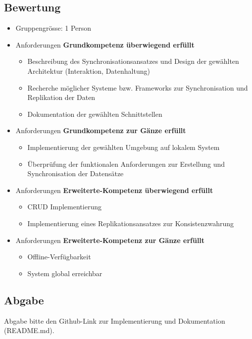 \subsection{Bewertung}
\begin{itemize}
	\item Gruppengrösse: 1 Person
	\item Anforderungen \textbf{Grundkompetenz überwiegend erfüllt}
	\begin{itemize}
		\item Beschreibung des Synchronisationsansatzes und Design der gewählten Architektur (Interaktion, Datenhaltung)
		\item Recherche möglicher Systeme bzw. Frameworks zur Synchronisation und Replikation der Daten
		\item Dokumentation der gewählten Schnittstellen
	\end{itemize}
	\item Anforderungen \textbf{Grundkompetenz zur Gänze erfüllt}
	\begin{itemize}
		\item Implementierung der gewählten Umgebung auf lokalem System
		\item Überprüfung der funktionalen Anforderungen zur Erstellung und Synchronisation der Datensätze
	\end{itemize}
	\item Anforderungen \textbf{Erweiterte-Kompetenz überwiegend erfüllt}
	\begin{itemize}
		\item CRUD Implementierung
		\item Implementierung eines Replikationsansatzes zur Konsistenzwahrung
	\end{itemize}
	\item Anforderungen \textbf{Erweiterte-Kompetenz zur Gänze erfüllt}
	\begin{itemize}
		\item Offline-Verfügbarkeit
		\item System global erreichbar
	\end{itemize}
\end{itemize}

\subsection{Abgabe}
Abgabe bitte den Github-Link zur Implementierung und Dokumentation (README.md).
\clearpage
